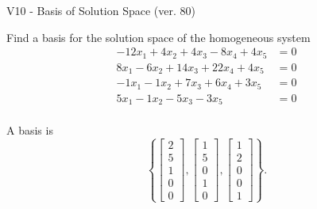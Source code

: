 \begin{exercise}
  \begin{exerciseTitle}V10 - Basis of Solution Space (ver. 80)\end{exerciseTitle}
  \begin{exerciseStatement}
    Find a basis for the solution space of the homogeneous system 
\begin{align*}
 -12 x_ 1 + 4 x_ 2 + 4 x_ 3 -8 x_ 4 + 4 x_ 5 &= 0  \\ 
  8 x_ 1 -6 x_ 2 + 14 x_ 3 + 22 x_ 4 + 4 x_ 5 &= 0  \\ 
  -1 x_ 1 -1 x_ 2 + 7 x_ 3 + 6 x_ 4 + 3 x_ 5 &= 0  \\ 
  5 x_ 1 -1 x_ 2 -5 x_ 3 -3 x_ 5 &= 0  \\ 
 \end{align*}


 
  \end{exerciseStatement}

  \begin{exerciseAnswer}
   A basis is   
\[\left\{\left[\begin{array}{c}
2 \\
5 \\
1 \\
0 \\
0
\end{array}\right] , \left[\begin{array}{c}
1 \\
5 \\
0 \\
1 \\
0
\end{array}\right] , \left[\begin{array}{c}
1 \\
2 \\
0 \\
0 \\
1
\end{array}\right]\right\}.\]

  


  \end{exerciseAnswer}
\end{exercise}